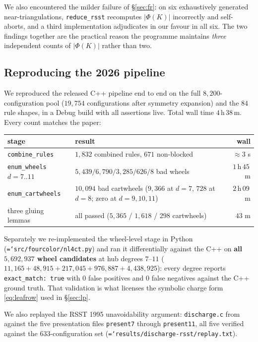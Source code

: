 \documentclass[11pt]{article}
\theoremstyle{definition}
\newcommand{\art}[1]{{\texttt{\hyphenchar\font=`\-\relax #1}}}
\begin{document}
We also encountered the milder failure of \S\ref{sec:fr}: on six exhaustively
generated near-triangulations, \texttt{reduce\_rsst} recomputes $|\Phi(K)|$
incorrectly and self-aborts, and a third implementation adjudicates in our favour in
all six. The two findings together are the practical reason the programme maintains
\emph{three} independent counts of $|\Phi(K)|$ rather than two.

\subsection{Reproducing the 2026 pipeline}

We reproduced the released C++ pipeline \cite{nl4ct2026} end to end on the full
$8{,}200$-configuration pool ($19{,}754$ configurations after symmetry expansion) and
the $84$ rule shapes, in a Debug build with all assertions live. Total wall time
$4$\,h\,$38$\,m. Every count matches the paper:

\begin{center}\small
\begin{tabular}{llr}
\toprule
stage & result & wall \\
\midrule
\texttt{combine\_rules}   & $1{,}832$ combined rules, $671$ non-blocked & $\approx3$ s \\
\texttt{enum\_wheels} $d{=}7..11$ & $5{,}439 / 6{,}790 / 3{,}285 / 626 / 8$ bad wheels & $1$\,h\,$45$\,m \\
\texttt{enum\_cartwheels} & $10{,}094$ bad cartwheels ($9{,}366$ at $d{=}7$, $728$ at $d{=}8$; zero at $d{=}9,10,11$) & $2$\,h\,$09$\,m \\
three gluing lemmas & all passed ($5{,}365$ / $1{,}618$ / $298$ cartwheels) & $43$ m \\
\bottomrule
\end{tabular}
\end{center}

Separately we re-implemented the wheel-level stage in Python
(\art{src/fourcolor/nl4ct.py}) and ran it differentially against the C++ on
\textbf{all $5{,}692{,}937$ wheel candidates} at hub degrees $7$--$11$
($11{,}165 + 48{,}915 + 217{,}045 + 976{,}887 + 4{,}438{,}925$): every degree reports
\texttt{exact\_match: true} with $0$ false positives and $0$ false negatives against
the C++ ground truth. That validation is what licenses the symbolic charge form
\eqref{eq:leafrow} used in \S\ref{sec:lp}.

We also replayed the RSST 1995 unavoidability argument: \texttt{discharge.c} from
\cite{rsst-discharge} against the five presentation files \texttt{present7}
through \texttt{present11}, all five verified against the $633$-configuration set
(\art{results/discharge-rsst/replay.txt}).
\end{document}
